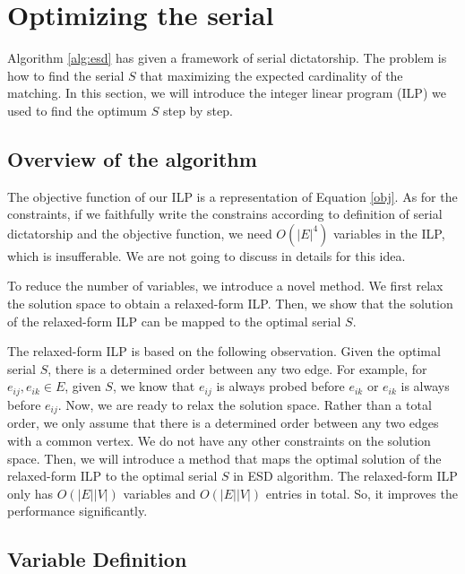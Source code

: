 \documentclass[letterpaper]{article}
\begin{document}
\section{Optimizing the serial}

Algorithm \ref{alg:esd} has given a framework of serial dictatorship. 
The problem is how to find the serial  $S$ that maximizing the expected cardinality of the matching.
In this section, we will introduce the integer linear program (ILP) we used to find the optimum $S$ step by step.

\subsection{Overview of the algorithm}

The objective function of our ILP is a representation of Equation \ref{obj}.
As for the constraints, if we faithfully write the constrains according to definition of serial dictatorship and the objective function, we need $O(|E|^4)$ variables in the ILP, which is insufferable. We are not going to discuss in details for this idea.

To reduce the number of variables, we introduce a novel method.
We first relax the solution space to obtain a relaxed-form ILP.
Then, we show that the solution of the relaxed-form ILP can be mapped to the optimal serial $S$.

The relaxed-form ILP is based on the following observation.
Given the optimal serial $S$, there is a determined order between any two edge.
For example, for $e_{ij}, e_{ik}\in E$, given $S$, we know that $e_{ij}$ is always probed before $e_{ik}$ or $e_{ik}$ is always before $e_{ij}$.
Now, we are ready to relax the solution space.
Rather than a total order, we only assume that there is a determined order between any two edges with a common vertex.
We do not have any other constraints on the solution space.
Then, we will introduce a method that maps the optimal solution of the relaxed-form ILP to the optimal serial $S$ in ESD algorithm.
The relaxed-form ILP only has $O(|E||V|)$ variables and $O(|E||V|)$ entries in total.
So, it improves the performance significantly.

\subsection{Variable Definition}
\end{document}
